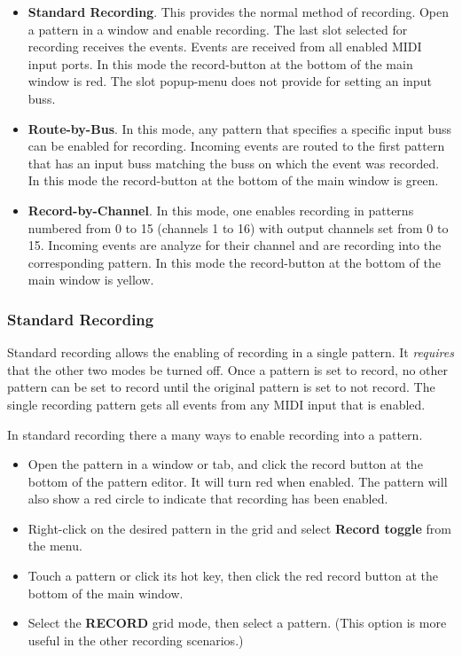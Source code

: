    \begin{itemize}
      \item \textbf{Standard Recording}.
         This provides the normal method of recording. Open a pattern in a
         window and enable recording.
         The last slot selected for recording receives the events.
         Events are received from all enabled MIDI input ports.
         In this mode the record-button at the bottom of the main window
         is red.
         The slot popup-menu does not provide for setting an input buss.
      \item \textbf{Route-by-Bus}.
         In this mode, any pattern that specifies a specific input buss
         can be enabled for recording.
         Incoming events are routed to the first pattern that has an input
         buss matching the buss on which the event was recorded.
         In this mode the record-button at the bottom of the main window
         is green.
      \item \textbf{Record-by-Channel}.
         In this mode, one enables recording in patterns numbered from 0 to 15
         (channels 1 to 16) with output channels set from 0 to 15.
         Incoming events are analyze for their channel and are recording into
         the corresponding pattern.
         In this mode the record-button at the bottom of the main window
         is yellow.
   \end{itemize}

\subsubsection{Standard Recording}
\label{subsubsec:recording_standard_recording}

   Standard recording allows the enabling of recording in a single pattern.
   It \textsl{requires} that the other two modes be turned off.
   Once a pattern is set to record, no other pattern can be set to record until
   the original pattern is set to not record.
   The single recording pattern gets all events from any MIDI
   input that is enabled.

   In standard recording there a many ways to enable recording into
   a pattern.

   \begin{itemize}
      \item Open the pattern in a window or tab, and click the record
         button at the bottom of the pattern editor.
         It will turn red when enabled. The pattern will also
         show a red circle to indicate that recording has been enabled.
      \item Right-click on the desired pattern in the grid and select
         \textbf{Record toggle} from the menu.
      \item Touch a pattern or click its hot key, then
         click the red record button at the bottom of the main window.
      \item Select the \textbf{RECORD} grid mode, then select a pattern.
         (This option is more useful in the other recording scenarios.)
   \end{itemize}

